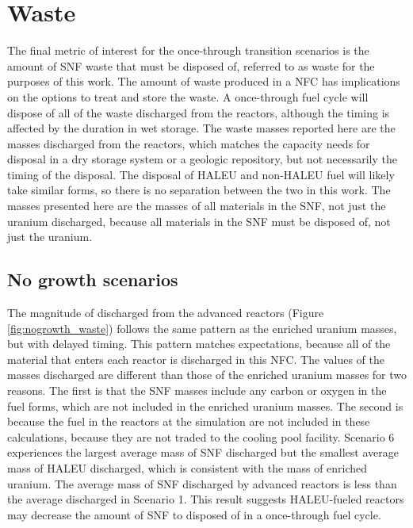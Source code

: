 \section{Waste}
The final metric of interest for the once-through transition scenarios is 
the amount of \gls{SNF} waste that must be disposed of, referred to as waste 
for the purposes of this work. 
The amount of waste produced in a \gls{NFC} has implications on the options 
to treat and store the waste. A once-through fuel cycle will dispose of 
all of the 
waste discharged from the reactors, although 
the timing is affected by the duration in wet storage. The waste masses 
reported here are the masses discharged from the reactors, which 
matches the capacity needs for disposal in a dry storage system or a 
geologic repository, but not necessarily the timing of the disposal. The 
disposal of \gls{HALEU} and non-\gls{HALEU} fuel will likely take similar 
forms, so there is no separation between the two in this work. The masses 
presented here are the masses of all materials in the \gls{SNF}, not just 
the uranium discharged, because all materials in the \gls{SNF} must be 
disposed of, not just the uranium. 

\subsection{No growth scenarios}
The magnitude of discharged from the advanced reactors 
(Figure \ref{fig:nogrowth_waste}) follows the same pattern as the enriched 
uranium masses, but with delayed timing. This pattern matches expectations, 
because all of the material that enters each reactor is discharged in this 
\gls{NFC}. The values of the masses discharged are different than those 
of the enriched uranium masses for two reasons. The first is that the 
\gls{SNF} masses include any carbon or oxygen in the fuel forms, which 
are not included in the enriched uranium masses. The second is because the 
fuel in the reactors at the simulation are not included in these 
calculations, because they are not traded to the cooling pool facility.
Scenario 6 experiences the largest average mass of \gls{SNF} 
discharged but the smallest average mass of \gls{HALEU} discharged,
which is consistent with the mass of enriched uranium.
The average mass of \gls{SNF} discharged by advanced reactors is less than 
the average discharged in Scenario 1. This result 
suggests \gls{HALEU}-fueled reactors may decrease the amount of \gls{SNF}
to disposed of in a once-through fuel cycle. 


